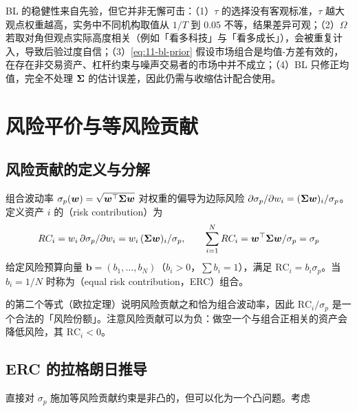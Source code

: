 \begin{warningbox}[BL 的失效条件]
BL 的稳健性来自先验，但它并非无懈可击：（1）$\tau$ 的选择没有客观标准，$\tau$ 越大观点权重越高，实务中不同机构取值从 $1/T$ 到 $0.05$ 不等，结果差异可观；（2）$\Omega$ 若取对角但观点实际高度相关（例如「看多科技」与「看多成长」），会被重复计入，导致后验过度自信；（3）\cref{eq:11-bl-prior} 假设市场组合是均值-方差有效的，在存在非交易资产、杠杆约束与噪声交易者的市场中并不成立；（4）BL 只修正均值，完全不处理 $\bm{\Sigma}$ 的估计误差，因此仍需与收缩估计配合使用。
\end{warningbox}

\section{风险平价与等风险贡献}

\subsection{风险贡献的定义与分解}

\begin{definition}[风险贡献与风险预算]\label{def:11-rc}
组合波动率 $\sigma_p(\bm{w}) = \sqrt{\bm{w}^{\top}\bm{\Sigma}\bm{w}}$ 对权重的偏导为边际风险 $\partial\sigma_p/\partial w_i = (\bm{\Sigma}\bm{w})_i/\sigma_p$。定义资产 $i$ 的（risk contribution）为
\begin{equation}\label{eq:11-rc}
  RC_i = w_i\,\partial \sigma_p/\partial w_i = w_i\,(\bm{\Sigma}\bm{w})_i/\sigma_p,
  \qquad \sum_{i=1}^{N}RC_i = \bm{w}^{\top}\bm{\Sigma}\bm{w}/\sigma_p = \sigma_p
\end{equation}
给定风险预算向量 $\mathbf{b} = (b_1,\dots,b_N)$（$b_i>0$，$\sum b_i = 1$），满足 $\text{RC}_i = b_i\sigma_p$。当 $b_i = 1/N$ 时称为（equal risk contribution，ERC）组合。
\end{definition}

 的第二个等式（欧拉定理）说明风险贡献之和恰为组合波动率，因此 $\text{RC}_i/\sigma_p$ 是一个合法的「风险份额」。注意风险贡献可以为负：做空一个与组合正相关的资产会降低风险，其 $\text{RC}_i < 0$。

\subsection{ERC 的拉格朗日推导}

直接对 $\sigma_p$ 施加等风险贡献约束是非凸的，但可以化为一个凸问题。考虑

